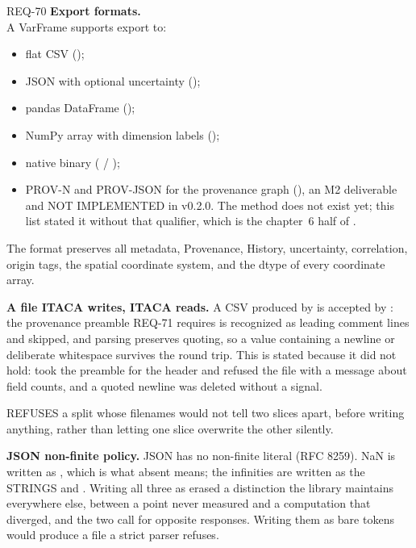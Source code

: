 \begin{reqbox}{REQ-70}{\stable}
\textbf{Export formats.}\\
A VarFrame supports export to:
\begin{itemize}[noitemsep,topsep=2pt]
  \item flat CSV ();
  \item JSON with optional uncertainty ();
  \item pandas DataFrame ();
  \item NumPy array with dimension labels
    ();
  \item native \itc{} binary  ( / );
  \item PROV-N and PROV-JSON for the provenance graph
    (), an M2
    deliverable and NOT IMPLEMENTED in v0.2.0. The method does not exist
    yet; this list stated it without that qualifier, which is the
    chapter~6 half of .
\end{itemize}
The  format preserves all metadata, Provenance, History,
uncertainty, correlation, origin tags, the spatial coordinate system,
and the dtype of every coordinate array.

\textbf{A file ITACA writes, ITACA reads.} A CSV produced by
 is accepted by : the provenance preamble
REQ-71 requires is recognized as leading comment lines and skipped, and
parsing preserves quoting, so a value containing a newline or
deliberate whitespace survives the round trip. This is stated because
it did not hold:  took the preamble for the header and
refused the file with a message about field counts, and a quoted
newline was deleted without a signal.

 REFUSES a split whose filenames would not
tell two slices apart, before writing anything, rather than letting one
slice overwrite the other silently.

\textbf{JSON non-finite policy.} JSON has no non-finite literal (RFC
8259). NaN is written as , which is what absent means; the
infinities are written as the STRINGS  and
. Writing all three as  erased a
distinction the library maintains everywhere else, between a point
never measured and a computation that diverged, and the two call for
opposite responses. Writing them as bare tokens would produce a file a
strict parser refuses.


\end{reqbox}
